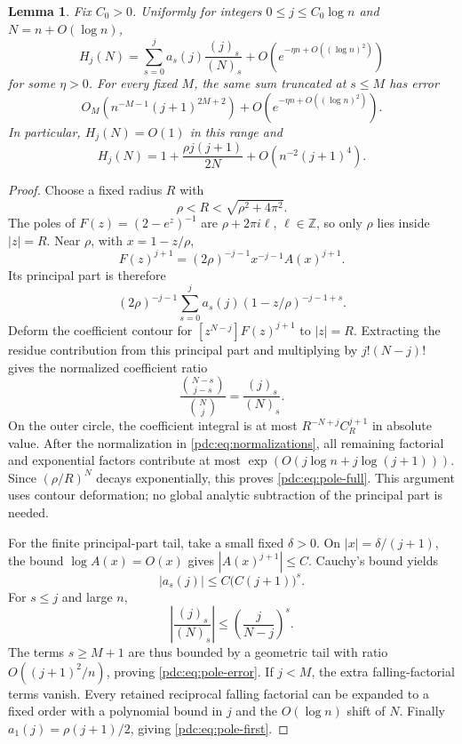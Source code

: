 \documentclass[11pt,letterpaper]{article}
\newtheorem{lemma}[theorem]{Lemma}
\theoremstyle{remark}\newtheorem{remark}[theorem]{Remark}
\newcommand{\fall}[2]{(#1)_{#2}}
\newcommand{\coef}[2]{[#1^{#2}]}
\begin{document}
\begin{lemma}\label{pdc:lem:pole}
Fix $C_0>0$. Uniformly for integers $0\leq j\leq C_0\log n$ and $N=n+O(\log n)$,
\begin{equation}\label{pdc:eq:pole-full}
 H_j(N)=\sum_{s=0}^j a_s(j)\frac{\fall{j}{s}}{\fall{N}{s}}
                 +O\!\left(e^{-\eta n+O((\log n)^2)}\right)
\end{equation}
for some $\eta>0$. For every fixed $M$, the same sum truncated at $s\leq M$ has error
\begin{equation}\label{pdc:eq:pole-error}
 O_M\!\left(n^{-M-1}(j+1)^{2M+2}\right)
       +O\!\left(e^{-\eta n+O((\log n)^2)}\right).
\end{equation}
In particular, $H_j(N)=O(1)$ in this range and
\begin{equation}\label{pdc:eq:pole-first}
 H_j(N)=1+\frac{\rho j(j+1)}{2N}
                 +O\!\left(n^{-2}(j+1)^4\right).
\end{equation}
\end{lemma}

\begin{proof}
Choose a fixed radius $R$ with
\[
 \rho<R<\sqrt{\rho^2+4\pi^2}.
\]
The poles of $F(z)=(2-e^z)^{-1}$ are $\rho+2\pi i\ell$, $\ell\in\mathbb Z$, so only $\rho$ lies inside $|z|=R$. Near $\rho$, with $x=1-z/\rho$,
\[
 F(z)^{j+1}=(2\rho)^{-j-1}x^{-j-1}A(x)^{j+1}.
\]
Its principal part is therefore
\[
 (2\rho)^{-j-1}\sum_{s=0}^j a_s(j)(1-z/\rho)^{-j-1+s}.
\]
Deform the coefficient contour for $\coef{z}{N-j}F(z)^{j+1}$ to $|z|=R$. Extracting the residue contribution from this principal part and multiplying by $j!(N-j)!$ gives the normalized coefficient ratio
\[
 \frac{\binom{N-s}{j-s}}{\binom Nj}
       =\frac{\fall{j}{s}}{\fall{N}{s}}.
\]
On the outer circle, the coefficient integral is at most $R^{-N+j}C_R^{j+1}$ in absolute value. After the normalization in \eqref{pdc:eq:normalizations}, all remaining factorial and exponential factors contribute at most $\exp(O(j\log n+j\log(j+1)))$. Since $(\rho/R)^N$ decays exponentially, this proves \eqref{pdc:eq:pole-full}. This argument uses contour deformation; no global analytic subtraction of the principal part is needed.

For the finite principal-part tail, take a small fixed $\delta>0$. On $|x|=\delta/(j+1)$, the bound $\log A(x)=O(x)$ gives $|A(x)^{j+1}|\leq C$. Cauchy's bound yields
\[
 |a_s(j)|\leq C\bigl(C(j+1)\bigr)^s.
\]
For $s\leq j$ and large $n$,
\[
 \left|\frac{\fall{j}{s}}{\fall{N}{s}}\right|
 \leq\left(\frac{j}{N-j}\right)^s.
\]
The terms $s\geq M+1$ are thus bounded by a geometric tail with ratio $O((j+1)^2/n)$, proving \eqref{pdc:eq:pole-error}. If $j<M$, the extra falling-factorial terms vanish. Every retained reciprocal falling factorial can be expanded to a fixed order with a polynomial bound in $j$ and the $O(\log n)$ shift of $N$. Finally $a_1(j)=\rho(j+1)/2$, giving \eqref{pdc:eq:pole-first}.
\end{proof}
\end{document}
